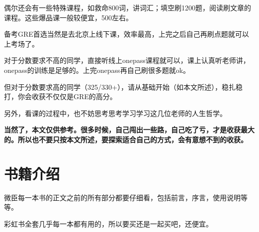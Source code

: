 \documentclass[cn,plain]{elegantbookex}
\begin{document}
偶尔还会有一些特殊课程，如救命800词，讲词汇；填空刷1200题，阅读刷文章的课程。这些爆品课一般较便宜，500左右。

备考GRE首选当然是去北京上线下课，效率最高，上完之后自己再刷点题就可以上考场了。

对于分数要求不高的同学，直接听线上onepass课程就可以，课上认真听老师讲，onepass的训练是足够的。上完onepass再自己刷很多题就ok。

但对于分数要求高的同学（325/330+），请从基础开始（如本文所述），稳扎稳打，你会收获不仅仅是GRE的高分。

另外，看课的过程中，也不妨思考思考学习学习这几位老师的人生哲学。

\textbf{当然了，本文仅供参考。很多时候，自己闯出一些路，自己吃了亏，才是收获最大的。所以也不要只按本文所述，要探索适合自己的方式，会有意想不到的收获。}

\section{书籍介绍}
微臣每一本书的正文之前的所有部分都要仔细看，包括前言，序言，使用说明等等。

彩虹书全套几乎每一本都有用的，所以要买还是一起买吧，还便宜。
\end{document}
